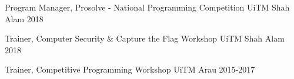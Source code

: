

\begin{cvhonors}

\cvhonor
  {Program Manager,} %
  {Prosolve - National Programming Competition} %
  {UiTM Shah Alam} %
  {2018} %

\cvhonor
  {Trainer,} %
  {Computer Security \& Capture the Flag Workshop} %
  {UiTM Shah Alam} %
  {2018} %

\cvhonor
  {Trainer,} %
  {Competitive Programming Workshop} %
  {UiTM Arau} %
  {2015-2017} %

\end{cvhonors}
